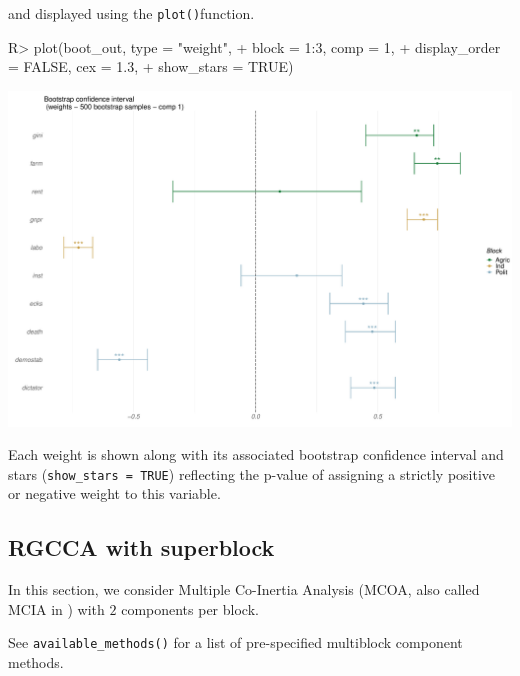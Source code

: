 \documentclass[
]{jss}
\begin{document}
\normalsize

and displayed using the \texttt{plot()}function.

\footnotesize

\begin{CodeChunk}
\begin{CodeInput}
R> plot(boot_out, type = "weight", 
+      block = 1:3, comp = 1, 
+      display_order = FALSE, cex = 1.3,
+      show_stars = TRUE)
\end{CodeInput}


\begin{center}\includegraphics{RGCCA_21022023_files/figure-latex/unnamed-chunk-14-1} \end{center}

\end{CodeChunk}

\normalsize

Each weight is shown along with its associated bootstrap confidence
interval and stars (\texttt{show\_stars\ =\ TRUE}) reflecting the
p-value of assigning a strictly positive or negative weight to this
variable.

\hypertarget{rgcca-with-superblock}{%
\subsection{RGCCA with superblock}\label{rgcca-with-superblock}}

In this section, we consider Multiple Co-Inertia Analysis
\citep{Chessel1996} (MCOA, also called MCIA in \citep{Cantini2021}) with
\(2\) components per block.

See \texttt{available\_methods()} for a list of pre-specified multiblock
component methods.
\end{document}
